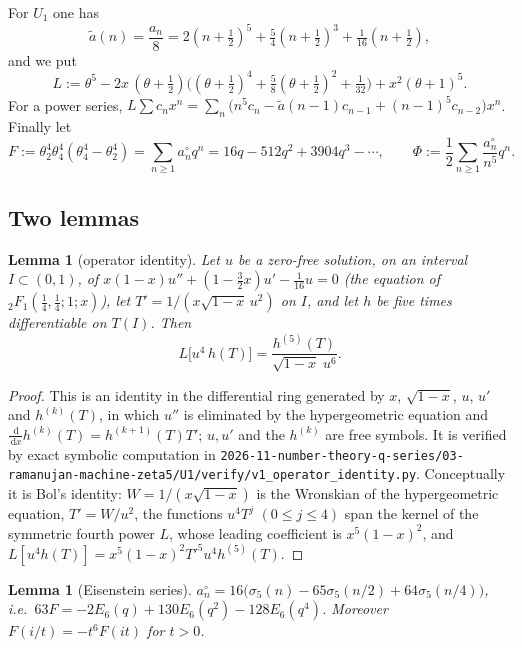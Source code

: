 \documentclass[11pt]{amsart}
\newtheorem{lemma}[theorem]{Lemma}
\theoremstyle{definition}
\theoremstyle{remark}
\numberwithin{equation}{section}
\newcommand{\dd}{\,\mathrm{d}}
\newcommand{\at}{\tilde a}
\newcommand{\file}[1]{\nolinkurl{2026-11-number-theory-q-series/03-ramanujan-machine-zeta5/#1}}
\begin{document}
For $U_1$ one has
\[
\at(n)=\frac{a_n}8=2(n+\tfrac12)^5+\tfrac54(n+\tfrac12)^3+\tfrac1{16}(n+\tfrac12),
\]
and we put
\[
L:=\theta^5-2x\,(\theta+\tfrac12)\bigl((\theta+\tfrac12)^4+\tfrac58(\theta+\tfrac12)^2+\tfrac1{32}\bigr)+x^2(\theta+1)^5 .
\]
For a power series, $L\sum c_nx^n=\sum_n\bigl(n^5c_n-\at(n-1)c_{n-1}+(n-1)^5c_{n-2}\bigr)x^n$. Finally let
\[
F:=\theta_2^4\theta_4^4(\theta_4^4-\theta_2^4)=\sum_{n\ge1}a^\circ_nq^n=16q-512q^2+3904q^3-\cdots,\qquad \Phi:=\frac12\sum_{n\ge1}\frac{a^\circ_n}{n^5}q^n.
\]

\subsection{Two lemmas}
\begin{lemma}[operator identity]\label{lem:A}
Let $u$ be a zero-free solution, on an interval $I\subset(0,1)$, of $x(1-x)u''+(1-\frac32x)u'-\frac1{16}u=0$ (the equation of ${}_2F_1(\frac14,\frac14;1;x)$), let $T'=1/(x\sqrt{1-x}\,u^2)$ on $I$, and let $h$ be five times differentiable on $T(I)$. Then
\[
L\bigl[u^4\,h(T)\bigr]=\frac{h^{(5)}(T)}{\sqrt{1-x}\;u^6}.
\]
\end{lemma}

\begin{proof}
This is an identity in the differential ring generated by $x$, $\sqrt{1-x}$, $u$, $u'$ and $h^{(k)}(T)$, in which $u''$ is eliminated by the hypergeometric equation and $\frac{\dd}{\dd x}h^{(k)}(T)=h^{(k+1)}(T)T'$; $u,u'$ and the $h^{(k)}$ are free symbols. It is verified by exact symbolic computation in \file{U1/verify/v1_operator_identity.py}. Conceptually it is Bol's identity: $W=1/(x\sqrt{1-x})$ is the Wronskian of the hypergeometric equation, $T'=W/u^2$, the functions $u^4T^j$ $(0\le j\le4)$ span the kernel of the symmetric fourth power $L$, whose leading coefficient is $x^5(1-x)^2$, and $L[u^4h(T)]=x^5(1-x)^2T'^5u^4h^{(5)}(T)$.
\end{proof}

\begin{lemma}[Eisenstein series]\label{lem:B}
$a^\circ_n=16\bigl(\sigma_5(n)-65\sigma_5(n/2)+64\sigma_5(n/4)\bigr)$, i.e.\ $63F=-2E_6(q)+130E_6(q^2)-128E_6(q^4)$. Moreover $F(i/t)=-t^6F(it)$ for $t>0$.
\end{lemma}
\end{document}
